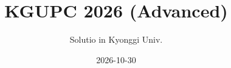 \documentclass[11pt]{article}
\title{KGUPC 2026 (Advanced)}
\author{Solutio in Kyonggi Univ.}
\date{2026-10-30}
\begin{document}
\problemsetfrontmatter

\checkselectedproblem
\end{document}

